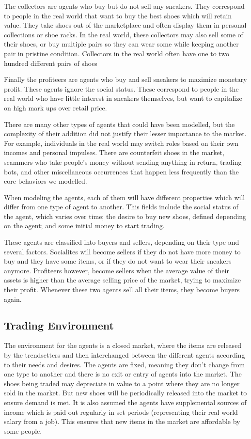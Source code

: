 \documentclass[12pt]{article}
\begin{document}
The collectors are agents who buy but do not sell any sneakers. They correspond to people in the real world that want to buy the best shoes which will retain value. They take shoes out of the marketplace and often display them in personal collections or shoe racks. In the real world, these collectors may also sell some of their shoes, or buy multiple pairs so they can wear some while keeping another pair in pristine condition. Collectors in the real world often have one to two hundred different pairs of shoes \cite{538}

Finally the profiteers are agents who buy and sell sneakers to maximize monetary profit. These agents ignore the social status. These correspond to people in the real world who have little interest in sneakers themselves, but want to capitalize on high mark ups over retail price.

There are many other types of agents that could have been modelled, but the complexity of their addition did not justify their lesser importance to the market. For example, individuals in the real world may switch roles based on their own incomes and personal impulses. There are counterfeit shoes in the market, scammers who take people's money without sending anything in return, trading bots, and other miscellaneous occurrences that happen less frequently than the core behaviors we modelled.

When modeling the agents, each of them will have different properties which will differ from one type of agent to another. This fields include the social status of the agent, which varies over time; the desire to buy new shoes, defined depending on the agent; and some initial money to start trading.

These agents are classified into buyers and sellers, depending on their type and several factors. Socialites will become sellers if they do not have more money to buy and they have some items, or if they do not want to wear their sneakers anymore. Profiteers however, become sellers when the average value of their assets is higher than the average selling price of the market, trying to maximize their profit. Whenever these two agents sell all their items, they become buyers again.

\subsection{Trading Environment}
\label{Env}
The environment for the agents is a closed market, where the items are released by the trendsetters and then interchanged between the different agents according to their needs and desires. The agents are fixed, meaning they don't change from one type to another and there is no exit or entry of agents into the market. The shoes being traded may depreciate in value to a point where they are no longer sold in the market. But new shoes will be periodically released into the market to ensure demand is met. It is also assumed the agents have supplemental sources of income which is paid out regularly in set periods (representing their real world salary from a job). This ensures that new items in the market are affordable by some people.
\end{document}
